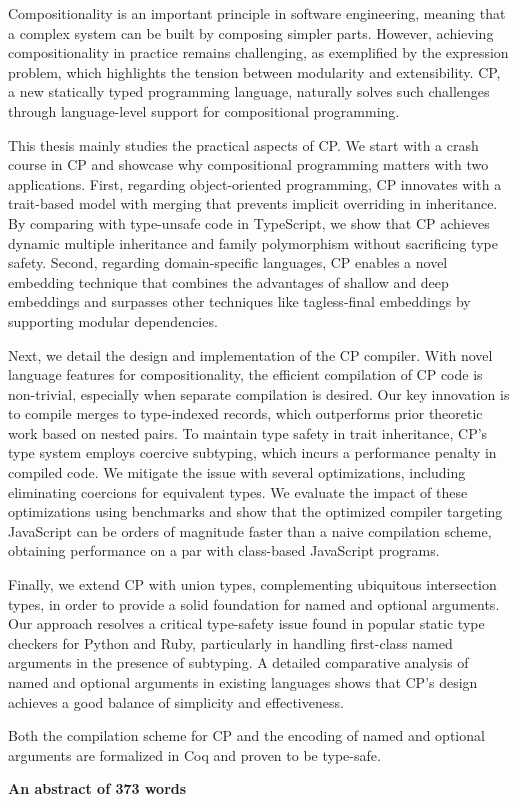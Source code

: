 Compositionality is an important principle in software engineering, meaning that
a complex system can be built by composing simpler parts. However, achieving
compositionality in practice remains challenging, as exemplified by the
expression problem, which highlights the tension between modularity and
extensibility. CP, a new statically typed programming language, naturally solves
such challenges through language-level support for compositional programming.

This thesis mainly studies the practical aspects of CP. We start with a crash
course in CP and showcase why compositional programming matters with two
applications. First, regarding object-oriented programming, CP innovates with a
trait-based model with merging that prevents implicit overriding in inheritance.
By comparing with type-unsafe code in TypeScript, we show that CP achieves
dynamic multiple inheritance and family polymorphism without sacrificing type
safety. Second, regarding domain-specific languages, CP enables a novel
embedding technique that combines the advantages of shallow and deep embeddings
and surpasses other techniques like tagless-final embeddings by supporting
modular dependencies.

Next, we detail the design and implementation of the CP compiler. With novel
language features for compositionality, the efficient compilation of CP code is
non-trivial, especially when separate compilation is desired. Our key innovation
is to compile merges to type-indexed records, which outperforms prior theoretic
work based on nested pairs. To maintain type safety in trait inheritance, CP's
type system employs coercive subtyping, which incurs a performance penalty in
compiled code. We mitigate the issue with several optimizations, including
eliminating coercions for equivalent types. We evaluate the impact of these
optimizations using benchmarks and show that the optimized compiler targeting
JavaScript can be orders of magnitude faster than a naive compilation scheme,
obtaining performance on a par with class-based JavaScript programs.

Finally, we extend CP with union types, complementing ubiquitous intersection
types, in order to provide a solid foundation for named and optional arguments.
Our approach resolves a critical type-safety issue found in popular static type
checkers for Python and Ruby, particularly in handling first-class named
arguments in the presence of subtyping. A detailed comparative analysis of named
and optional arguments in existing languages shows that CP's design achieves a
good balance of simplicity and effectiveness.

Both the compilation scheme for CP and the encoding of named and optional
arguments are formalized in Coq and proven to be type-safe.

\vspace{1.5\baselineskip}

\noindent\makebox[\linewidth]{\rule{0.7\textwidth}{0.4pt}}

\begin{center}
\textbf{An abstract of 373 words}
\end{center}
